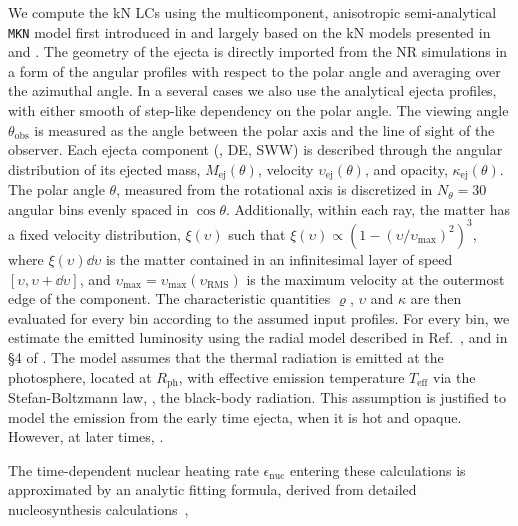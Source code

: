 We compute the \ac{kN} \acp{LC} using the multicomponent, anisotropic semi-analytical \texttt{MKN} model first introduced in \citet{Perego:2017wtu} and largely based on the \ac{kN} models presented in \citet{Grossman:2013lqa} and \citet{Martin:2015hxa}.
The geometry of the ejecta is directly imported from the 
\ac{NR} simulations in a form of the angular profiles with 
respect to the polar angle and averaging over the azimuthal angle.
In a several cases we also use the analytical ejecta profiles, with either smooth of step-like dependency on the polar angle.
The viewing angle $\theta_{\text{obs}}$ is measured as the angle between the 
polar axis and the line of sight of the observer.
Each ejecta component (\eg, \ac{DE}, \ac{SWW}) is described through 
the angular distribution of its ejected mass, $M_{\text{ej}}(\theta)$, 
velocity $\upsilon_{\text{ej}}(\theta)$,
and opacity, $\kappa_{\text{ej}}(\theta)$.
The polar angle $\theta$, measured from the rotational axis is discretized in $N_\theta=30$ angular bins evenly spaced in $\cos{\theta}$.
Additionally, within each ray, the matter 
has a fixed velocity distribution, $\xi(\upsilon)$ such that $\xi(\upsilon) \propto (1 - \left(\upsilon/\upsilon_{\text{max}}\right)^{2})^{3}$, where $\xi(\upsilon) \dd \upsilon$ is the matter contained in an infinitesimal layer of speed $\left[\upsilon,\upsilon+\dd \upsilon\right]$, and $\upsilon_{\text{max}}=\upsilon_{\text{max}}(\upsilon_{\text{RMS}})$ is the maximum velocity at the outermost edge of the component.
The characteristic quantities $\varrho$, $\upsilon$ and $\kappa$ are then evaluated for every bin according to the assumed input profiles.
For every bin, we estimate the emitted luminosity using the radial model described in Ref.~\cite{Perego:2017wtu}, and in \S{4} of \citet{Barbieri:2019kli}.
The model assumes that the thermal radiation is emitted at the photosphere, located at $R_{\text{ph}}$, with 
effective emission temperature $T_{\text{eff}}$ via the 
Stefan-Boltzmann law, \ie, the black-body radiation. 
This assumption is justified to model the emission from the early time ejecta, when it is hot and opaque. However, at later times, .

The time-dependent nuclear heating
rate $\epsilon_{\text{nuc}}$  entering these calculations is approximated by an analytic fitting formula, derived from detailed nucleosynthesis calculations~\cite{Korobkin:2012uy},

